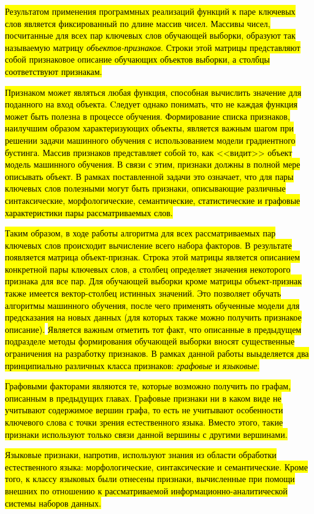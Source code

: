 \hl{Результатом применения программных реализаций функций к паре ключевых слов является фиксированный по длине массив чисел. Массивы чисел, посчитанные для всех пар ключевых слов обучающей выборки, образуют так называемую матрицу \emph{объектов-признаков}. Строки этой матрицы представляют собой признаковое описание обучающих объектов выборки, а столбцы соответствуют признакам. }

\hl{Признаком может являться любая функция, способная вычислить значение для поданного на вход объекта. Cледует однако понимать, что не каждая функция может быть полезна в процессе обучения. Формирование списка признаков, наилучшим образом характеризующих объекты, является важным шагом при решении задачи машинного обучения с использованием модели градиентного бустинга. Массив признаков представляет собой то, как <<видит>> объект модель машинного обучения. В связи с этим, признаки должны в полной мере описывать объект. В рамках поставленной задачи это означает, что для пары ключевых слов полезными могут быть признаки, описывающие различные синтаксические, морфологические, семантические, статистические и графовые характеристики пары рассматриваемых слов.}

\hl{Таким образом, в ходе работы алгоритма для всех рассматриваемых пар ключевых слов происходит вычисление всего набора факторов. В результате появляется матрица объект-признак. Строка этой матрицы является описанием конкретной пары ключевых слов, а столбец определяет значения некоторого признака для все пар. Для обучающей выборки кроме матрицы объект-признак также имеется вектор-столбец истинных значений. Это позволяет обучать алгоритмы машинного обучения, после чего применять обученные модели для предсказания на новых данных (для которых также можно получить признакое описание).}
\hl{ Является важным отметить тот факт, что описанные в предыдущем подразделе методы формирования обучающей выборки вносят существенные ограничения на разработку признаков. В рамках данной работы выыделяется два принципиально различных класса признаков: \emph{графовые} и \emph{языковые}. }

\hl{Графовыми факторами являются те, которые возможно получить по графам, описанным в предыдущих главах. Графовые признаки ни в каком виде не учитывают содержимое вершин графа, то есть не учитывают особенности ключевого слова с точки зрения естественного языка. Вместо этого, такие признаки используют только связи данной вершины с другими вершинами.}

\hl{Языковые признаки, напротив, используют знания из области обработки естественного языка: морфологические, синтаксические и семантические. Кроме того, к классу языковых были отнесены признаки, вычисленные при помощи внешних по отношению к рассматриваемой информационно-аналитической системы наборов данных.}

